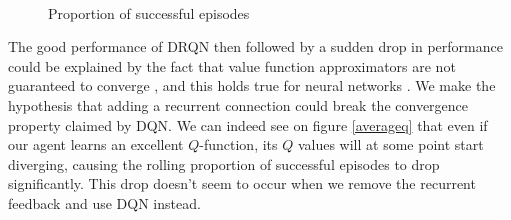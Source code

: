 \documentclass[letterpaper]{article}
\begin{document}
\begin{figure}
	\\
	\caption{Proportion of successful episodes}
	\label{successrate}
\end{figure}

The good performance of DRQN then followed by a sudden drop in performance could
be explained by the fact that value function approximators are not guaranteed
to converge \citep{divergenceofRL}, and this holds true for
neural networks \citep{convergenceofRL}.
We make the hypothesis that adding a recurrent connection could break the
convergence property claimed by DQN.
We can indeed see on figure \ref{averageq} that
even if our agent learns an excellent $Q$-function, its $Q$ values will at some
point start diverging, causing the rolling proportion of successful episodes
to drop significantly. This drop doesn't seem to occur when we remove the
recurrent feedback and use DQN instead.\\
\end{document}
